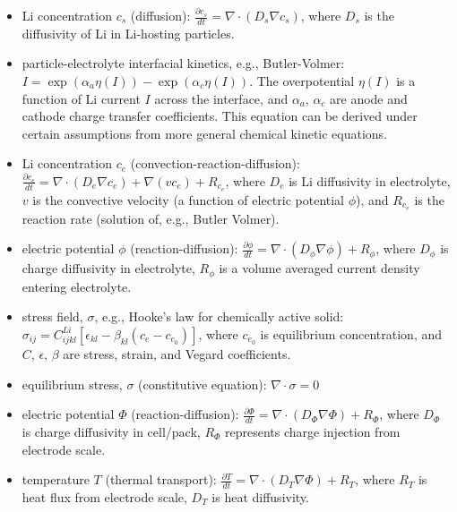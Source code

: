 \documentclass[11pt]{article}
\begin{document}
\begin{itemize}\itemsep -0.0em
\item
Li concentration $c_s$ (diffusion): $\frac{\partial c_s}{dt} = \nabla \cdot (D_s \nabla c_s)$, where
$D_s$ is the diffusivity of Li in Li-hosting particles.
\item
particle-electrolyte interfacial kinetics, e.g., Butler-Volmer: $I = \exp(\alpha_a \eta(I)) - \exp(\alpha_c \eta(I))$.  The overpotential $\eta(I)$ is a function of Li current $I$ across the interface, and $\alpha_a$, $\alpha_c$
are anode and cathode charge transfer coefficients.  This equation can be derived under certain assumptions from more general chemical kinetic equations.
\end{itemize}

\begin{itemize}\itemsep -0.0em
\item
Li concentration $c_e$ (convection-reaction-diffusion): $\frac{\partial c_e}{dt} = \nabla \cdot (D_e \nabla c_e) + \nabla (v c_e) + R_{c_e}$, where $D_e$ is Li diffusivity in electrolyte, $v$ is the 
convective velocity (a function of electric potential $\phi$), and $R_{c_e}$ is the reaction rate (solution of, e.g., Butler
Volmer). 
\item
electric potential $\phi$ (reaction-diffusion): $\frac{\partial \phi}{dt} = \nabla \cdot (D_{\phi} \nabla \phi)  + R_{\phi}$, where $D_{\phi}$ is charge diffusivity in electrolyte, $R_{\phi}$ is a volume averaged current density entering electrolyte.
\item
stress field, $\sigma$, e.g., Hooke's law for chemically active solid: $\sigma_{ij} = C_{ijkl}^{Li} [\epsilon_{kl} - \beta_{kl}(c_e - c_{e_0})] $, where $c_{e_0}$ is equilibrium concentration, and $C$, $\epsilon$, $\beta$ are stress, strain, and Vegard coefficients.
\item
equilibrium stress, $\sigma$ (constitutive equation): $\nabla \cdot \sigma = 0$ 
\end{itemize}

\begin{itemize}\itemsep -0.0em
\item
electric potential $\Phi$ (reaction-diffusion): $\frac{\partial \Phi}{dt} = \nabla \cdot (D_{\Phi} \nabla \Phi) + R_{\Phi}$,
where $D_{\Phi}$ is charge diffusivity in cell/pack, $R_{\Phi}$ represents charge injection from electrode scale. 
\item
temperature $T$ (thermal transport): $\frac{\partial T}{dt} = \nabla \cdot (D_T \nabla \Phi) + R_T$, where $R_T$ is heat flux from electrode scale, $D_T$ is heat diffusivity.
\end{itemize}
\end{document}
